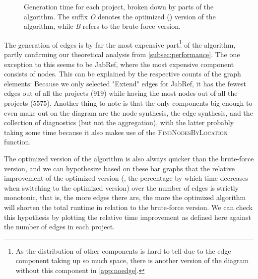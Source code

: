 \documentclass[../thesis]{subfiles}
\begin{document}
\begin{figure}
\begin{subfigure}[T]{0.5\textwidth}
\begin{center}
		\end{center}
	\end{subfigure}
	\caption{Generation time for each project, broken down by parts of the algorithm.
		The suffix \emph{O} denotes the optimized () version of the algorithm, while \emph{B} refers to the brute-force version.
	}\label{fig:techeval}
\end{figure}

The generation of edges is by far the most expensive part\footnote{
	As the distribution of other components is hard to tell due to the edge component taking up so much space, there is another version of the diagram without this component in \cref{app:noedge}.
} of the algorithm, partly confirming our theoretical analysis from \cref{subsec:performance}.
The one exception to this seems to be JabRef, where the most expensive component consists of nodes.
This can be explained by the respective counts of the graph elements:
Because we only selected "Extend" edges for JabRef, it has the fewest edges out of all the projects ($919$) while having the most nodes out of all the projects ($5575$).
Another thing to note is that the only components big enough to even make out on the diagram are the node synthesis, the edge synthesis, and the collection of diagnostics (but not the aggregation), with the latter probably taking some time because it also makes use of the \textsc{FindNodesByLocation} function.

The optimized version of the algorithm is also always quicker than the brute-force version, and we can hypothesize based on these bar graphs that the relative improvement of the optimized version (\ie, the percentage by which time decreases when switching to the optimized version) over the number of edges is strictly monotonic, that is, the more edges there are, the more the optimized algorithm will shorten the total runtime in relation to the brute-force version.
We can check this hypothesis by plotting the relative time improvement as defined here against the number of edges in each project.
\end{document}
